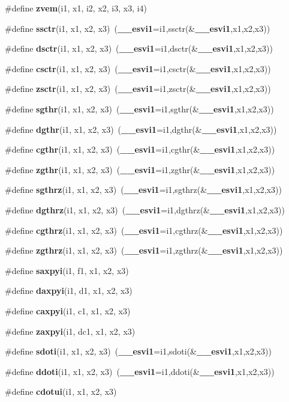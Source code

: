 \begin{CompactItemize}
\item 
\#define {\bf zvem}(i1, x1, i2, x2, i3, x3, i4)
\item 
\#define {\bf ssctr}(i1, x1, x2, x3)~({\bf \_\-\_\-esvi1}=i1,ssctr(\&{\bf \_\-\_\-esvi1},x1,x2,x3))
\item 
\#define {\bf dsctr}(i1, x1, x2, x3)~({\bf \_\-\_\-esvi1}=i1,dsctr(\&{\bf \_\-\_\-esvi1},x1,x2,x3))
\item 
\#define {\bf csctr}(i1, x1, x2, x3)~({\bf \_\-\_\-esvi1}=i1,csctr(\&{\bf \_\-\_\-esvi1},x1,x2,x3))
\item 
\#define {\bf zsctr}(i1, x1, x2, x3)~({\bf \_\-\_\-esvi1}=i1,zsctr(\&{\bf \_\-\_\-esvi1},x1,x2,x3))
\item 
\#define {\bf sgthr}(i1, x1, x2, x3)~({\bf \_\-\_\-esvi1}=i1,sgthr(\&{\bf \_\-\_\-esvi1},x1,x2,x3))
\item 
\#define {\bf dgthr}(i1, x1, x2, x3)~({\bf \_\-\_\-esvi1}=i1,dgthr(\&{\bf \_\-\_\-esvi1},x1,x2,x3))
\item 
\#define {\bf cgthr}(i1, x1, x2, x3)~({\bf \_\-\_\-esvi1}=i1,cgthr(\&{\bf \_\-\_\-esvi1},x1,x2,x3))
\item 
\#define {\bf zgthr}(i1, x1, x2, x3)~({\bf \_\-\_\-esvi1}=i1,zgthr(\&{\bf \_\-\_\-esvi1},x1,x2,x3))
\item 
\#define {\bf sgthrz}(i1, x1, x2, x3)~({\bf \_\-\_\-esvi1}=i1,sgthrz(\&{\bf \_\-\_\-esvi1},x1,x2,x3))
\item 
\#define {\bf dgthrz}(i1, x1, x2, x3)~({\bf \_\-\_\-esvi1}=i1,dgthrz(\&{\bf \_\-\_\-esvi1},x1,x2,x3))
\item 
\#define {\bf cgthrz}(i1, x1, x2, x3)~({\bf \_\-\_\-esvi1}=i1,cgthrz(\&{\bf \_\-\_\-esvi1},x1,x2,x3))
\item 
\#define {\bf zgthrz}(i1, x1, x2, x3)~({\bf \_\-\_\-esvi1}=i1,zgthrz(\&{\bf \_\-\_\-esvi1},x1,x2,x3))
\item 
\#define {\bf saxpyi}(i1, f1, x1, x2, x3)
\item 
\#define {\bf daxpyi}(i1, d1, x1, x2, x3)
\item 
\#define {\bf caxpyi}(i1, c1, x1, x2, x3)
\item 
\#define {\bf zaxpyi}(i1, dc1, x1, x2, x3)
\item 
\#define {\bf sdoti}(i1, x1, x2, x3)~({\bf \_\-\_\-esvi1}=i1,sdoti(\&{\bf \_\-\_\-esvi1},x1,x2,x3))
\item 
\#define {\bf ddoti}(i1, x1, x2, x3)~({\bf \_\-\_\-esvi1}=i1,ddoti(\&{\bf \_\-\_\-esvi1},x1,x2,x3))
\item 
\#define {\bf cdotui}(i1, x1, x2, x3)

\end{CompactItemize}
